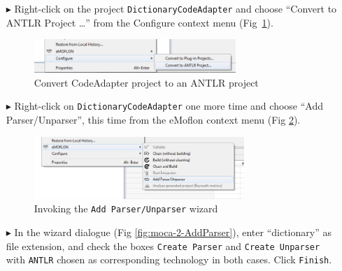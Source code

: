\begin{enumerate}
\item[$\blacktriangleright$] Right-click on the project
\texttt{DictionaryCodeAdapter} and choose ``Convert to ANTLR Project \ldots'' from the Configure context menu (Fig~\ref{fig:moca-0-ConvertToANTLRProject.jpg}).

\begin{figure}[!htbp]
\begin{center}
 \includegraphics[width=0.72\textwidth]{pics/moca/2TextToMocaTree/0-ConvertToANTLRProject.jpg}
  \caption{Convert CodeAdapter project to an ANTLR project} 
  \label{fig:moca-0-ConvertToANTLRProject.jpg}
\end{center} 
\end{figure} 

\item[$\blacktriangleright$] Right-click on \texttt{DictionaryCodeAdapter} one more time and choose ``Add Parser/Unparser'', this time from the eMoflon context menu (Fig \ref{fig:moca-1-AddParserAndUnparserWizard}).

\begin{figure}[!htbp]
\begin{center}
 \includegraphics[width=0.75\textwidth]{pics/moca/2TextToMocaTree/1-AddParserAndUnparserWizard}
  \caption{Invoking the \texttt{Add Parser/Unparser} wizard} 
  \label{fig:moca-1-AddParserAndUnparserWizard}
\end{center}
\end{figure}
 
\item[$\blacktriangleright$] In the wizard dialogue (Fig \ref{fig:moca-2-AddParser}), enter ``dictionary'' as file extension, and check the boxes \texttt{Create Parser} and \texttt{Create Unparser} with \texttt{ANTLR} chosen as corresponding technology in both cases.  Click \texttt{Finish}. 


\end{enumerate}
